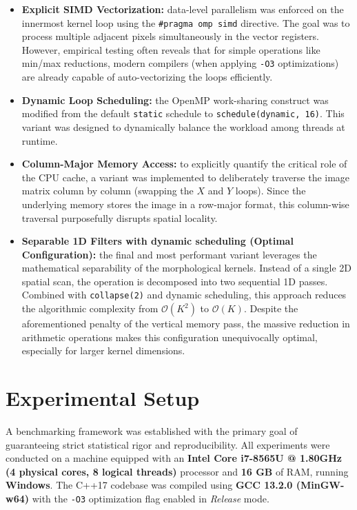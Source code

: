 \documentclass[10pt,twocolumn,letterpaper]{article}
\begin{document}
\begin{itemize}
    \item \textbf{Explicit SIMD Vectorization:} data-level parallelism was enforced on the innermost kernel loop using the \lstinline|#pragma omp simd| directive. The goal was to process multiple adjacent pixels simultaneously in the vector registers. However, empirical testing often reveals that for simple operations like min/max reductions, modern compilers (when applying \lstinline|-O3| optimizations) are already capable of auto-vectorizing the loops efficiently. 
    
    \item \textbf{Dynamic Loop Scheduling:} the OpenMP work-sharing construct was modified from the default \lstinline|static| schedule to \lstinline|schedule(dynamic, 16)|. This variant was designed to dynamically balance the workload among threads at runtime.
    
    \item \textbf{Column-Major Memory Access:} to explicitly quantify the critical role of the CPU cache, a variant was implemented to deliberately traverse the image matrix column by column (swapping the $X$ and $Y$ loops). Since the underlying memory stores the image in a row-major format, this column-wise traversal purposefully disrupts spatial locality. 
    
    \item \textbf{Separable 1D Filters with dynamic scheduling (Optimal Configuration):} the final and most performant variant leverages the mathematical separability of the morphological kernels. Instead of a single 2D spatial scan, the operation is decomposed into two sequential 1D passes. Combined with \lstinline|collapse(2)| and dynamic scheduling, this approach reduces the algorithmic complexity from $\mathcal{O}(K^2)$ to $\mathcal{O}(K)$. Despite the aforementioned penalty of the vertical memory pass, the massive reduction in arithmetic operations makes this configuration unequivocally optimal, especially for larger kernel dimensions.
\end{itemize}


\section{Experimental Setup}
\label{sec:experimental_setup}

A benchmarking framework was established with the primary goal of guaranteeing strict statistical rigor and reproducibility. All experiments were conducted on a machine equipped with an \textbf{Intel Core i7-8565U @ 1.80GHz (4 physical cores, 8 logical threads)} processor and \textbf{16 GB} of RAM, running \textbf{Windows}. The C++17 codebase was compiled using \textbf{GCC 13.2.0 (MinGW-w64)} with the \lstinline|-O3| optimization flag enabled in \textit{Release} mode. 
\end{document}

